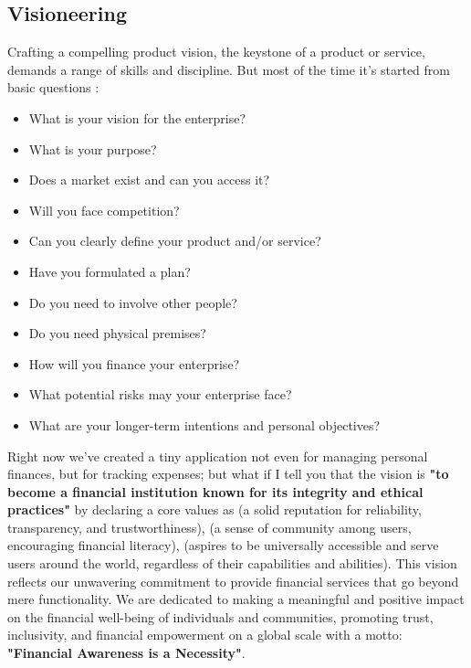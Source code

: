 
\subsection{Visioneering}

Crafting a compelling product vision, the keystone of a product or service, demands a range of skills and discipline.
But most of the time it's started from basic questions \cite{Barr13}:

\begin{itemize}
  \item What is your vision for the enterprise?
  \item What is your purpose?
  \item Does a market exist and can you access it?
  \item Will you face competition?
  \item Can you clearly define your product and/or service?
  \item Have you formulated a plan?
  \item Do you need to involve other people?
  \item Do you need physical premises?
  \item How will you finance your enterprise?
  \item What potential risks may your enterprise face?
  \item What are your longer-term intentions and personal objectives?
\end{itemize}

\noindent Right now we've created a tiny application not even for managing personal finances, but for tracking expenses; 
but what if I tell you that the vision is \textbf{"to become a financial institution known for its integrity and ethical 
practices"} by declaring a core values as  (a solid reputation for reliability, transparency, and 
trustworthiness),  (a sense of community among users, encouraging financial literacy), 
 (aspires to be universally accessible and serve users around the world, regardless of their 
capabilities and abilities). This vision reflects our unwavering commitment to provide financial services that go 
beyond mere functionality. We are dedicated to making a meaningful and positive impact on the financial well-being of
individuals and communities, promoting trust, inclusivity, and financial empowerment on a global scale with a motto: 
\textbf{"Financial Awareness is a Necessity"}.

